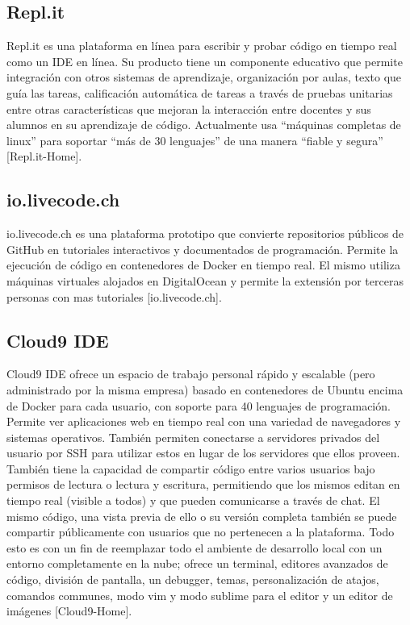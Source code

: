 \subsection{Repl.it}
Repl.it es una plataforma en línea para escribir y probar código en tiempo real como un IDE en línea. Su producto tiene un componente educativo que permite integración con otros sistemas de aprendizaje, organización por aulas, texto que guía las tareas, calificación automática de tareas a través de pruebas unitarias entre otras características que mejoran la interacción entre docentes y sus alumnos en su aprendizaje de código. Actualmente usa “máquinas completas de linux” para soportar “más de 30 lenguajes” de una manera “fiable y segura” [Repl.it-Home].

\subsection{io.livecode.ch}
io.livecode.ch es una plataforma prototipo que convierte repositorios públicos de GitHub en tutoriales interactivos y documentados de programación. Permite la ejecución de código en contenedores de Docker en tiempo real. El mismo utiliza máquinas virtuales alojados en DigitalOcean y permite la extensión por terceras personas con mas tutoriales [io.livecode.ch].

\subsection{Cloud9 IDE}
Cloud9 IDE ofrece un espacio de trabajo personal rápido y escalable (pero administrado por la misma empresa) basado en contenedores de Ubuntu encima de Docker para cada usuario, con soporte para 40 lenguajes de programación. Permite ver aplicaciones web en tiempo real con una variedad de navegadores y sistemas operativos. También permiten conectarse a servidores privados del usuario por SSH para utilizar estos en lugar de los servidores que ellos proveen. También tiene la capacidad de compartir código entre varios usuarios bajo permisos de lectura o lectura y escritura, permitiendo que los mismos editan en tiempo real (visible a todos) y que pueden comunicarse a través de chat. El mismo código, una vista previa de ello o su versión completa también se puede compartir públicamente con usuarios que no pertenecen a la plataforma. Todo esto es con un fin de reemplazar todo el ambiente de desarrollo local con un entorno completamente en la nube; ofrece un terminal, editores avanzados de código, división de pantalla, un debugger, temas, personalización de atajos, comandos communes, modo vim y modo sublime para el editor y un editor de imágenes [Cloud9-Home].

